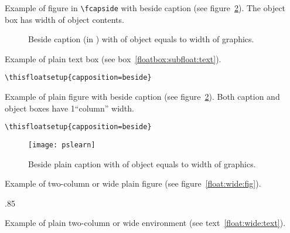\Text

\clearpage
Example of figure in \verb|\fcapside| with beside caption (see figure~\ref{floatbox:beside:figI}).
The object box has width of object contents.
\begin{figure}
{\caption{Beside caption (in \protect{}) with of object equals to width of
graphics. \text}%
\label{floatbox:beside:figI}}
\end{figure}

\Text

\clearpage
Example of plain text box (see box~\ref{floatbox:subfloat:text}).
\begin{verbatim}
\thisfloatsetup{capposition=beside}
\end{verbatim}
\begin{textbox}
{\TEXTBOX}
{\caption{Beside plain caption. \text}%
\label{floatbox:beside:text}}
\end{textbox}


\Text

\clearpage
Example of plain figure with beside caption (see figure~\ref{floatbox:beside:figI}).
Both caption and object boxes have 1``column'' width.
\begin{verbatim}
\thisfloatsetup{capposition=beside}
\end{verbatim}
\begin{figure}
{\texttt{[image: pslearn]}}
{\caption{Beside plain caption with of object equals to width of
graphics. \text}%
\label{floatbox:beside:figI}}
\end{figure}

\Text

\fi

\ifWideLayout
\clearpage
Example of two-column or wide plain figure (see figure~\ref{float:wide:fig}).

\begin{figure*}
  {\unitlength.85\unitlength\ifx\pspicture\undefined\else{}\fi
  }%
  \caption{%
Plain wide figure. \text }%
\label{float:wide:fig}%
\end{figure*}

\Text

\clearpage
Example of plain two-column or wide  environment
(see text~\ref{float:wide:text}).

\begin{textbox*}
\TEXTBOX
  \caption{Plain wide textbox. \text }%
\label{float:wide:text}%
\end{textbox*}


